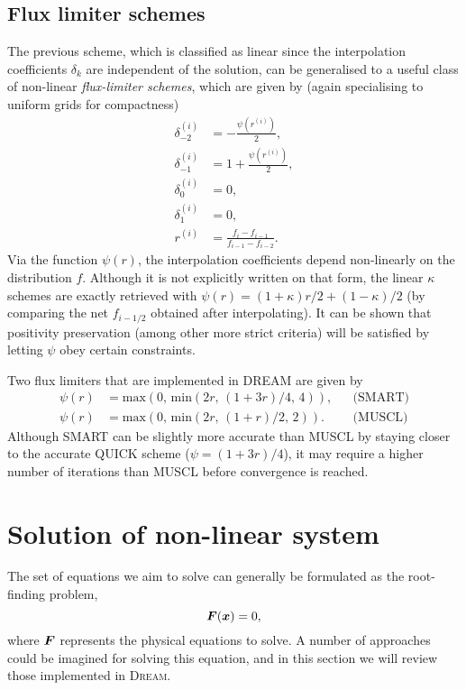 \documentclass{notes}
\newcommand{\DREAM}{\textsc{Dream}}
\begin{document}
    \subsection{Flux limiter schemes}
    The previous scheme, which is classified as linear since the interpolation 
    coefficients $\delta_k$ are independent of the solution, can be generalised to a 
    useful class of non-linear \emph{flux-limiter schemes}, which are given by
    (again specialising to uniform grids for compactness)
    \begin{align}
    \delta^{(i)}_{-2} &= -\frac{\psi(r^{(i)})}{2}, \nonumber \\
    \delta^{(i)}_{-1} &= 1 + \frac{\psi(r^{(i)})}{2}, \nonumber \\
    \delta^{(i)}_{0} &= 0, \nonumber \\
    \delta^{(i)}_{1} &= 0, \nonumber \\
    r^{(i)} &= \frac{f_i - f_{i-1}}{f_{i-1}-f_{i-2}}.
    \end{align}
    Via the function $\psi(r)$, the interpolation coefficients depend non-linearly on 
    the distribution $f$. Although it is not explicitly written on that form, the linear $\kappa$ schemes 
    are exactly retrieved with $\psi(r) = (1+\kappa)r/2 + (1-\kappa)/2$ (by comparing the net $f_{i-1/2}$ 
    obtained after interpolating). It can be shown that positivity preservation (among other more strict criteria)
    will be satisfied by letting $\psi$ obey certain constraints.
    
    Two flux limiters that are implemented in DREAM are given by
    \begin{align}
    \psi(r) &= \text{max}(0,\,\text{min}(2r,\,(1+3r)/4,\,4)), && \text{(SMART)} \nonumber \\
    \psi(r) &= \text{max}(0,\,\text{min}(2r,\,(1+r)/2,\,2)). && \text{(MUSCL)}
    \end{align}
    Although SMART can be slightly more accurate than MUSCL by staying closer to the accurate 
    QUICK scheme ($\psi=(1+3r)/4$), it may require a higher number of iterations than MUSCL 
    before convergence is reached.

    \section{Solution of non-linear system}
    The set of equations we aim to solve can generally be formulated as the
    root-finding problem,
    \begin{equation}\label{eq:nonlinear}
        \boldsymbol{F}(\boldsymbol{x}) = 0,
    \end{equation}
    where $\boldsymbol{F}$ represents the physical equations to solve. A number of
    approaches could be imagined for solving this equation, and in this section
    we will review those implemented in \DREAM.
\end{document}
